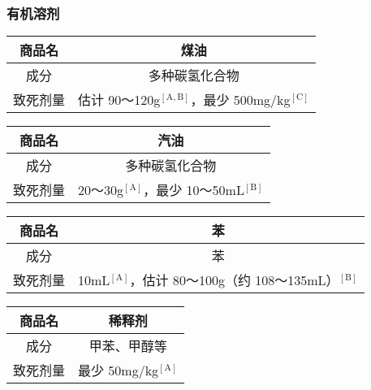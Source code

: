 \documentclass[UTF8]{ctexart}
\begin{document}
\subsubsection*{有机溶剂}

\begin{table}[htbp]
\begin{center}
\begin{tabular}{cc}

\toprule
商品名 & 煤油 \\
\midrule
成分 & 多种碳氢化合物 \\
致死剂量 & 估计 90～120g$^\mathrm{[A,B]}$，最少 500mg/kg$^\mathrm{[C]}$ \\
\bottomrule
\end{tabular}
\end{center}
\end{table}

\begin{table}[htbp]
\begin{center}
\begin{tabular}{cc}

\toprule
商品名 & 汽油 \\
\midrule
成分 & 多种碳氢化合物 \\
致死剂量 & 20～30g$^\mathrm{[A]}$，最少 10～50mL$^\mathrm{[B]}$ \\
\bottomrule
\end{tabular}
\end{center}
\end{table}



\begin{table}[htbp]
\begin{center}
\begin{tabular}{cc}

\toprule
商品名 & 苯 \\
\midrule
成分 & 苯 \\
致死剂量 & 10mL$^\mathrm{[A]}$，估计 80～100g（约 108～135mL）$^\mathrm{[B]}$ \\
\bottomrule
\end{tabular}
\end{center}
\end{table}

\begin{table}[htbp]
\begin{center}
\begin{tabular}{cc}

\toprule
商品名 & 稀释剂 \\
\midrule
成分 & 甲苯、甲醇等 \\
致死剂量 & 最少 50mg/kg$^\mathrm{[A]}$ \\
\bottomrule
\end{tabular}
\end{center}
\end{table}
\end{document}
